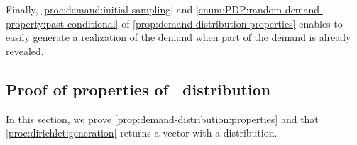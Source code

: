 Finally, \cref{proc:demand:initial-sampling} and \cref{enum:PDP:random-demand-property:past-conditional} of \cref{prop:demand-distribution:properties} enables to easily generate a realization of the demand when part of the demand is already revealed.



\subsection{Proof of properties of \distrib\ distribution}
\label{sec:PDP:numerical-experiments:instances:proofs}


In this section, we prove \cref{prop:demand-distribution:properties} and that \cref{proc:dirichlet:generation} returns a vector with a \distrib distribution.


